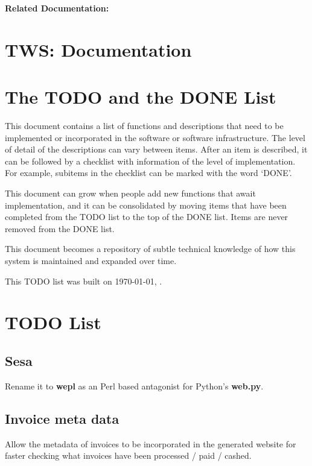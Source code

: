 \documentclass[12pt]{article}
\begin{document}
{\bf Related Documentation:}

\section*{TWS: Documentation}

\section{The TODO and the DONE List}

This document contains a list of functions and descriptions that need
to be implemented or incorporated in the software or software
infrastructure.  The level of detail of the descriptions can vary
between items.  After an item is described, it can be followed by a
checklist with information of the level of implementation.  For
example, subitems in the checklist can be marked with the word `DONE'.

This document can grow when people add new functions that await
implementation, and it can be consolidated by moving items that have
been completed from the TODO list to the top of the DONE list.  Items
are never removed from the DONE list.

This document becomes a repository of subtle technical knowledge of
how this system is maintained and expanded over time.

This TODO list was built on \today, \thistime.


\section{TODO List}

\subsection{Sesa}

Rename it to {\bf wepl} as an Perl based antagonist for Python's {\bf
  web.py}.

\subsection{Invoice meta data}

Allow the metadata of invoices to be incorporated in the generated
website for faster checking what invoices have been processed / paid /
cashed.
\end{document}
